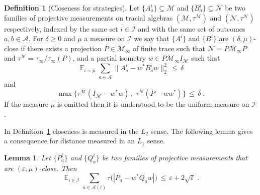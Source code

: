 \documentclass[11pt]{article}
\newtheorem{lemma}[theorem]{Lemma}
\theoremstyle{definition}
\newtheorem{definition}[theorem]{Definition}
\newcommand{\Id}{\ensuremath{I}}
\DeclareMathOperator*{\Expectation}{\mathbb{E}}
\newcommand{\Es}[1]{\Expectation_{#1}}
\newcommand{\mA}{\ensuremath{\mathcal{A}}}
\newcommand{\mM}{\ensuremath{\mathcal{M}}}
\newcommand{\mI}{\ensuremath{\mathcal{I}}}
\newcommand{\eps}{\varepsilon}
\newcommand{\mN}{\mathcal{N}}
\begin{document}
	\begin{definition}[Closeness for strategies]\label{def:close-meas}
Let $\{A^i_a\}\subseteq \mM$ and $\{B^i_a\}\subseteq \mN$ be two families of projective measurements on  tracial algebras $(\mM,\tau^\mM)$ and $(\mN,\tau^\mN)$ respectively, indexed by the same set $i\in \mI$ and with the same set of outcomes $a,b\in\mA$. For $\delta\geq0$ and $\mu$ a measure on $\mI$ we say that $\{A^i\}$ and $\{B^i\}$ are $(\delta,\mu)$-close if there exists a projection $P\in\mM_\infty$ of finite trace such that $\mN=P\mM_\infty P$ and $\tau^\mN=\tau_\infty/\tau_\infty(P)$, and a partial isometry $w\in P \mM_\infty \Id_\mM$ such that 
\[ \Es{i\sim\mu} \sum_{a\in\mA} \big\| A^i_a - w^* B^i_a w \big\|_2^2 \,\leq\,\delta\]
and 
\[\max\big\{ \tau^\mM(\Id_\mM-w^*w)\,,\; \tau^\mN(P-ww^*)\big\} \,\leq\, \delta\;.\]
If the measure $\mu$ is omitted then it is understood to be the uniform measure on $\mI$.
\end{definition}

In Definition~\ref{def:close-meas} closeness is measured in the $L_2$ sense. The following lemma gives a consequence for distance measured in an $L_1$ sense. 


\begin{lemma}\label{lem:l1-l2}
Let $\{P_a^i\}$ and $\{Q_a^i\}$ be two families of projective measurements that are $(\eps,\mu)$-close. Then 
\begin{equation}\label{eq:l1-l2}
\Es{i\in\mI} \sum_{a\in \mA(i)} \tau\big(|P_a-w^*Q_aw|\big) \,\leq\, \eps+ 2 \sqrt{\eps}\;.
\end{equation}
\end{lemma}
\end{document}
